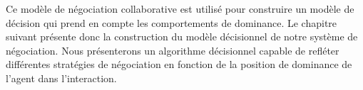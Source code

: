 			Ce modèle de négociation collaborative est utilisé pour construire un modèle de décision qui prend en compte les comportements de dominance. Le chapitre suivant présente donc la construction du modèle décisionnel de notre système de négociation. Nous présenterons un algorithme décisionnel capable de refléter différentes stratégies de négociation en fonction de la position de dominance de l'agent dans l'interaction.
					
			
	
